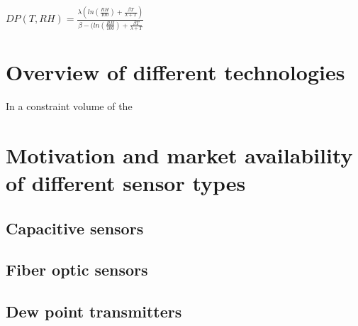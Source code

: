 $DP(T, RH) = \frac{\lambda(ln(\frac{RH}{100})+\frac{\beta T}{\lambda + T})}{\beta - (ln(\frac{RH}{100})+\frac{\beta T}{\lambda + T}}$

\section{Overview of different technologies}
In a constraint volume of the 
\section{Motivation and market availability of different sensor types}

\subsection{Capacitive sensors}

\subsection{Fiber optic sensors}

\subsection{Dew point transmitters}

